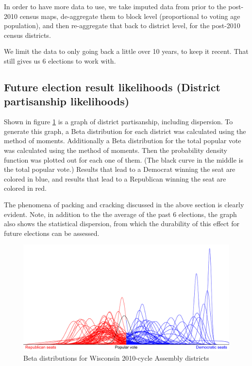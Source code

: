 \documentclass[preprint,12pt]{article}
\begin{document}
In order to have more data to use, we take imputed data from prior to the post-2010 census maps, de-aggregate them to block level (proportional to voting age population), and then re-aggregate that back to district level, for the post-2010 census districts.
 
We limit the data to only going back a little over 10 years, to keep it recent.  That still gives us 6 elections to work with.
 
\subsection{Future election result likelihoods (District partisanship likelihoods)}
 
Shown in figure \ref{fig:Betas} is a graph of district partisanship, including dispersion.  To generate this graph, a Beta distribution for each district was calculated using the method of moments.  Additionally a Beta distribution for the total popular vote was calculated using the method of moments.  Then the probability density function was plotted out for each one of them.  (The black curve in the middle is the total popular vote.) Results that lead to a Democrat winning the seat are colored in blue, and results that lead to a Republican winning the seat are colored in red.
 
The phenomena of packing and cracking discussed in the above section is clearly evident.  Note, in addition to the the average of the past 6 elections, the graph also shows the statistical dispersion, from which the durability of this effect for future elections can be assessed.

\begin{figure}[htb!]
    \begin{center}
        \includegraphics[scale=0.25]{../Figures/WI2010/betas_cropped.png}
        \caption{Beta distributions for Wisconsin 2010-cycle Assembly districts}\label{fig:Betas}
    \end{center}
\end{figure}
 
\end{document}
